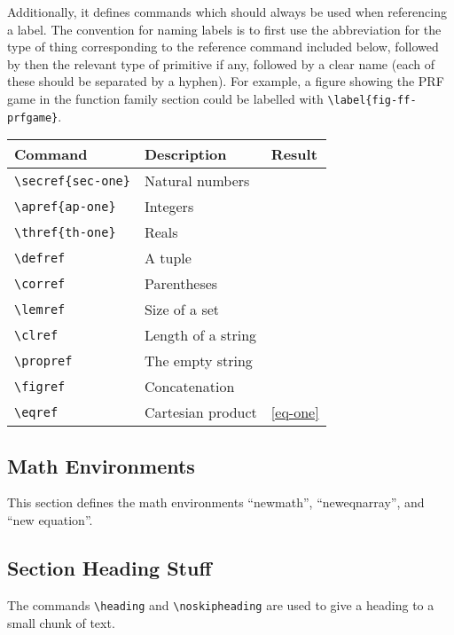 \documentclass[11pt,twoside]{report}
\begin{document}
Additionally, it defines commands which should always be used when referencing a label.
The convention for naming labels is to first use the abbreviation for the type of thing corresponding to the reference command included below, followed by then the relevant type of primitive if any, followed by a clear name (each of these should be separated by a hyphen).
For example, a figure showing the PRF game in the function family section could be labelled with \lstinline$\label{fig-ff-prfgame}$.
\begin{center}
\begin{tabular}{l l l}
	\textbf{Command} & \textbf{Description} & \textbf{Result} \\\hline
	\lstinline$\secref{sec-one}$ & Natural numbers & \secref{sec-one}  \\
	\lstinline$\apref{ap-one}$ & Integers & \apref{ap-one}  \\
	\lstinline$\thref{th-one}$ & Reals & \thref{th-one} \\
	\lstinline$\defref$ & A tuple & {def-one} \\
	\lstinline$\corref$ & Parentheses & \corref{cor-one}  \\
	\lstinline$\lemref$ & Size of a set & \lemref{lem-one}  \\
	\lstinline$\clref$ & Length of a string & \clref{clr-one} \\
	\lstinline$\propref$ & The empty string  & \propref{prop-one}  \\
	\lstinline$\figref$ & Concatenation & \figref{fig-one} \\
	\lstinline$\eqref$ & Cartesian product & \eqref{eq-one}
\end{tabular}
\end{center}

\subsection{Math Environments}
This section defines the math environments ``newmath'', ``neweqnarray'', and ``new equation''.

\subsection{Section Heading Stuff}
The commands \lstinline$\heading$ and \lstinline$\noskipheading$ are used to give a heading to a small chunk of text.
\end{document}

